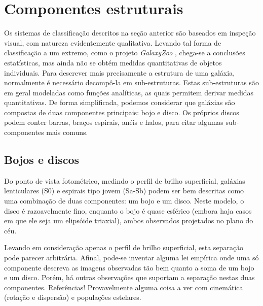 
\section{Componentes estruturais}

Os sistemas de classificação descritos na seção anterior são baseados em
inspeção visual, com natureza evidentemente qualitativa. Levando tal forma de
classificação a um extremo, como o projeto {\em GalaxyZoo} \citep{Lintott2008,
Willett2013}, chega-se a conclusões estatísticas, mas ainda não se obtém medidas
quantitativas de objetos individuais. Para descrever mais precisamente a
estrutura de uma galáxia, normalmente é necessário decompô-la em sub-estruturas.
Estas sub-estruturas são em geral modeladas como funções analíticas, as quais
permitem derivar medidas quantitativas. De forma simplificada, podemos
considerar que galáxias são compostas de duas componentes principais: bojo e
disco. Os próprios discos podem conter barras, braços espirais, anéis e halos,
para citar algumas sub-componentes mais comuns.


\subsection{Bojos e discos}

Do ponto de vista fotométrico, medindo o perfil de brilho superficial, galáxias
lenticulares (S0) e espirais tipo jovem (Sa-Sb) podem ser bem descritas como uma
combinação de duas componentes: um bojo e um disco. Neste modelo, o disco é
razoavelmente fino, enquanto o bojo é quase esférico (embora haja casos em que
ele seja um elipsóide triaxial), ambos observados projetados no plano do céu.

Levando em consideração apenas o perfil de brilho superficial, esta separação
pode parecer arbitrária. Afinal, pode-se inventar alguma lei empírica onde uma
só componente descreva as imagens observadas tão bem quanto a soma de um bojo e
um disco. Porém, há outras observações que suportam a separação nestas duas
componentes. \TODO Referências! Provavelmente alguma coisa a ver com cinemática
(rotação e dispersão) e populações estelares.

